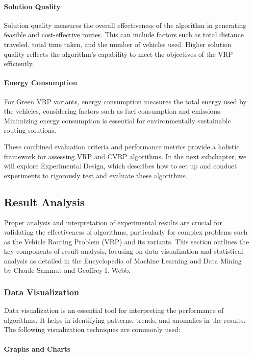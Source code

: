 \documentclass[
]{article}
\begin{document}
  \paragraph{Solution Quality} Solution quality measures the overall effectiveness of the algorithm in generating feasible and cost-effective routes. This can include factors such as total distance traveled, total time taken, and the number of vehicles used. Higher solution quality reflects the algorithm’s capability to meet the objectives of the VRP efficiently.
  
  \paragraph{Energy Consumption} For Green VRP variants, energy consumption measures the total energy used by the vehicles, considering factors such as fuel consumption and emissions. Minimizing energy consumption is essential for environmentally sustainable routing solutions.
  
  
  These combined evaluation criteria and performance metrics provide a holistic framework for assessing VRP and CVRP algorithms. In the next subchapter, we will explore Experimental Design, which describes how to set up and conduct experiments to rigorously test and evaluate these algorithms.


  \subsection{Result Analysis}

Proper analysis and interpretation of experimental results are crucial for validating the effectiveness of algorithms, particularly for complex problems such as the Vehicle Routing Problem (VRP) and its variants. This section outlines the key components of result analysis, focusing on data visualization and statistical analysis as detailed in the Encyclopedia of Machine Learning and Data Mining by Claude Sammut and Geoffrey I. Webb.

\subsubsection{Data Visualization}

Data visualization is an essential tool for interpreting the performance of algorithms. It helps in identifying patterns, trends, and anomalies in the results. The following visualization techniques are commonly used:

\paragraph{Graphs and Charts}
\end{document}
